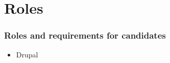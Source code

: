 \section{Roles}

\begin{frame}[allowframebreaks]
\frametitle{Roles and requirements for candidates}

    \begin{itemize}
	    \item Drupal
	\end{itemize}

\end{frame}

